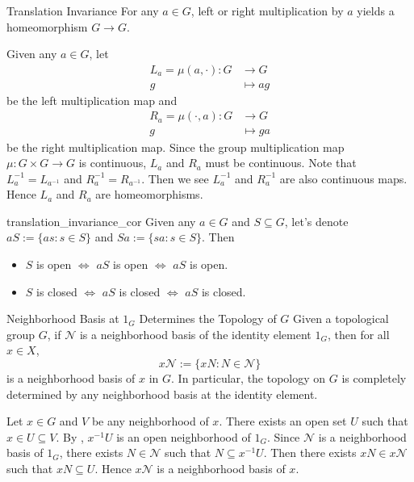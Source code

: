 \documentclass{report}
\begin{document}
\begin{proposition}{Translation Invariance}{}
	For any $a \in G$, left or right multiplication by $a$ yields a homeomorphism $G \rightarrow G$.
\end{proposition}

\begin{prf}
	Given any $a\in G$, let
	\begin{align*}
		L_a=\mu(a,\cdot):G & \longrightarrow G \\
		g                  & \longmapsto ag
	\end{align*}
	be the left multiplication map and
	\begin{align*}
		R_a=\mu(\cdot,a):G & \longrightarrow G \\
		g                  & \longmapsto ga
	\end{align*}
	be the right multiplication map. Since the group multiplication map $\mu:G\times G\to G$ is continuous, $L_a$ and $R_a$ must be continuous. Note that $L_a^{-1}=L_{a^{-1}}$ and $R_a^{-1}=R_{a^{-1}}$. Then we see $L_a^{-1}$ and $R_a^{-1}$ are also continuous maps. Hence $L_a$ and $R_a$ are homeomorphisms.
\end{prf}


\begin{corollary}{}{translation_invariance_cor}
	Given any $a \in G$ and $S \subseteq G$, let's denote $a S:=\{a s: s \in S\}$ and $S a:=\{s a: s \in S\}$. Then
	\begin{itemize}
		\item $S$ is open $\iff$ $a S$ is open $\iff$ $a S$ is open.
		\item $S$ is closed $\iff$ $a S$ is closed $\iff$ $a S$ is closed.
	\end{itemize}
\end{corollary}

\begin{proposition}{Neighborhood Basis at $1_G$ Determines the Topology of $G$}{}
	Given a topological group $G$, if $\mathcal{N}$ is a neighborhood basis of the identity element $1_G$, then for all $x \in X$,
	\[
		x \mathcal{N}:=\{x N: N \in \mathcal{N}\}
	\]
	is a neighborhood basis of $x$ in $G$. In particular, the topology on $G$ is completely determined by any neighborhood basis at the identity element.
\end{proposition}

\begin{prf}
	Let $x \in G$ and $V$ be any neighborhood of $x$. There exists an open set $U$ such that $x\in U\subseteq V$. By , $x^{-1} U$ is an open neighborhood of $1_G$. Since $\mathcal{N}$ is a neighborhood basis of $1_G$, there exists $N \in \mathcal{N}$ such that $N \subseteq x^{-1} U$. Then there exists $x N \in x \mathcal{N}$ such that $x N \subseteq U$. Hence $x \mathcal{N}$ is a neighborhood basis of $x$.
\end{prf}
\end{document}
